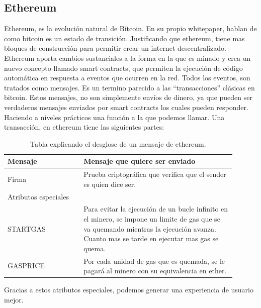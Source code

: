 \subsection{Ethereum}
Ethereum, es la evolución natural de Bitcoin. En su propio whitepaper, hablan de como bitcoin es un estado de transición. Justificando que ethereum, tiene mas bloques de construcción para permitir crear un internet descentralizado. Ethereum aporta cambios sustanciales a la forma en la que es minado y crea un nuevo concepto llamado smart contracts, que permiten la ejecución de código automática en respuesta a eventos que ocurren en la red.
Todos los eventos, son tratados como mensajes. Es un termino parecido a las “transacciones” clásicas en bitcoin. Estos mensajes, no son simplemente envíos de dinero, ya que pueden ser verdaderos mensajes enviados por smart contracts los cuales pueden responder. Haciendo a niveles prácticos una función a la que podemos llamar.
Una transacción, en ethereum tiene las siguientes partes:
\begin{center}
    \begin{table}[h!]
        \begin{tabular}{|p{0.3\linewidth} | p{0.6\linewidth}|}
            \hline
            Mensaje & Mensaje que quiere ser enviado \\
            \hline
            Firma   & Prueba criptográfica que verifica que el sender es quien dice ser. \\
            \hline
            Atributos especiales & \\
            \hline
            STARTGAS &  Para evitar la ejecución de un bucle infinito en el minero, se impone un limite de gas que se va quemando mientras la ejecución avanza. Cuanto mas se tarde en ejecutar mas gas se quema. \\
            \hline
            GASPRICE & Por cada unidad de gas que es quemada, se le pagará al minero con su equivalencia en ether. \\
            \hline
        \end{tabular}
        \label{tab:ethereum_msg}
        \caption{Tabla explicando el desglose de un mensaje de ethereum.}
    \end{table}
\end{center}
Gracias a estos atributos especiales, podemos generar una experiencia de usuario mejor.
